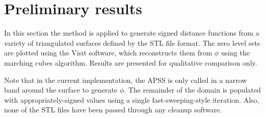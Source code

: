 \documentclass[final,3p,times,twocolumn]{elsarticle}
\begin{document}
\section{Preliminary results}

In this section the method is applied to generate signed distance functions from a variety
of triangulated surfaces defined by the STL file format. The zero level sets are plotted
using the Visit software, which reconstructs them from $\phi$ using the marching cubes algorithm.
Results are presented for qualitative comparison only.
\par
Note that in the current implementation, the APSS is only called in a narrow band around the surface
to generate $\phi$. The remainder of the domain is populated with appropriately-signed values using
a single fast-sweeping-style iteration. Also, none of the STL files have been passed through
any cleanup software.
\end{document}
